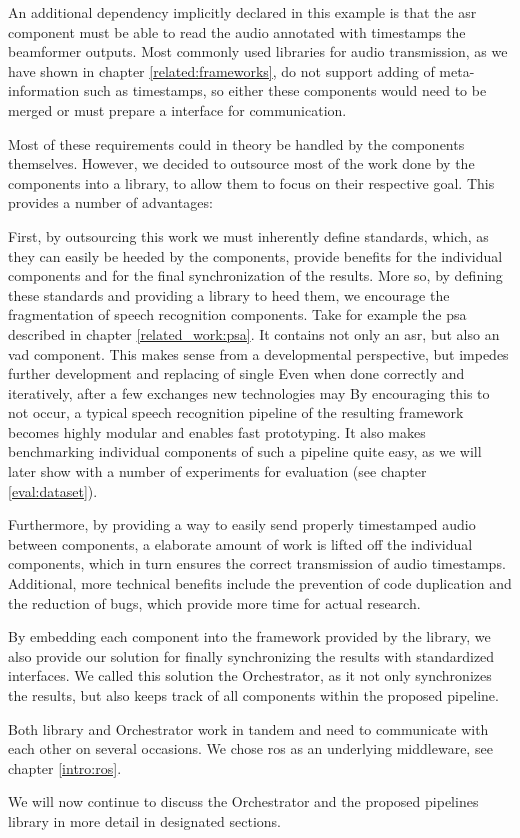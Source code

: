 An additional dependency implicitly declared in this example is that the \gls{asr} component must be able to read the audio annotated with timestamps the beamformer outputs.
Most commonly used libraries for audio transmission, as we have shown in chapter \ref{related:frameworks}, do not support adding of meta-information such as timestamps, so either these components would need to be merged or must prepare a interface for communication.

Most of these requirements could in theory be handled by the components themselves.
However, we decided to outsource most of the work done by the components into a library, to allow them to focus on their respective goal.
This provides a number of advantages:

First, by outsourcing this work we must inherently define standards, which, as they can easily be heeded by the components, provide benefits for the individual components and for the final synchronization of the results.
More so, by defining these standards and providing a library to heed them, we encourage the fragmentation of speech recognition components. 
Take for example the \gls{psa} described in chapter \ref{related_work:psa}.
It contains not only an \gls{asr}, but also an \gls{vad} component.
This makes sense from a developmental perspective, but impedes further development and replacing of single 
Even when done correctly and iteratively, after a few exchanges new technologies may 
By encouraging this to not occur, a typical speech recognition pipeline of the resulting framework becomes highly modular and enables fast prototyping.
It also makes benchmarking individual components of such a pipeline quite easy, as we will later show with a number of experiments for evaluation (see chapter \ref{eval:dataset}).

Furthermore, by providing a way to easily send properly timestamped audio between components, a elaborate amount of work is lifted off the individual components, which in turn ensures the correct transmission of audio timestamps.
Additional, more technical benefits include the prevention of code duplication and the reduction of bugs, which provide more time for actual research.

By embedding each component into the framework provided by the library, we also provide our solution for finally synchronizing the results with standardized interfaces.
We called this solution the Orchestrator, as it not only synchronizes the results, but also keeps track of all components within the proposed pipeline.

Both library and Orchestrator work in tandem and need to communicate with each other on several occasions.
We chose \gls{ros} as an underlying middleware, see chapter \ref{intro:ros}.

We will now continue to discuss the Orchestrator and the proposed pipelines library in more detail in designated sections.



\newpage

\newpage

\newpage
